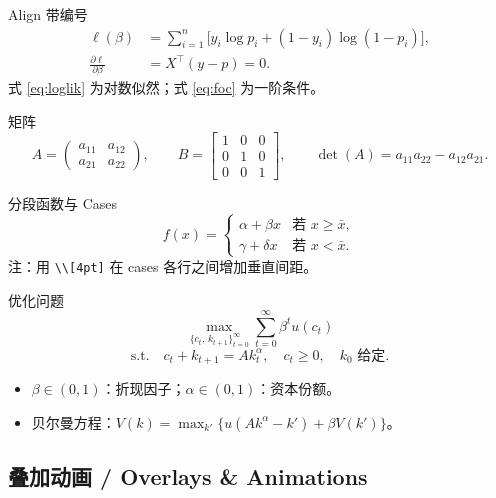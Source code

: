 \begin{frame}{Align 带编号}
  \begin{align}
    \ell(\beta) &= \sum_{i=1}^{n}
      \bigl[y_i \log p_i + (1-y_i)\log(1-p_i)\bigr], \label{eq:loglik} \\
    \frac{\partial \ell}{\partial \beta} &= X^\top(y - p) = 0. \label{eq:foc}
  \end{align}
  式 \eqref{eq:loglik} 为对数似然；式 \eqref{eq:foc} 为一阶条件。
\end{frame}

\begin{frame}{矩阵}
  \[
    A = \begin{pmatrix} a_{11} & a_{12} \\ a_{21} & a_{22} \end{pmatrix}, \qquad
    B = \begin{bmatrix} 1 & 0 & 0 \\ 0 & 1 & 0 \\ 0 & 0 & 1 \end{bmatrix}, \qquad
    \det(A) = a_{11}a_{22} - a_{12}a_{21}.
  \]
\end{frame}

\begin{frame}{分段函数与 Cases}
  \[
    f(x) = \begin{cases}
      \alpha + \beta x   & \text{若 } x \geq \bar{x}, \\[4pt]
      \gamma + \delta x  & \text{若 } x < \bar{x}.
    \end{cases}
  \]
  \medskip
  注：用 \texttt{\textbackslash\textbackslash[4pt]} 在 cases 各行之间增加垂直间距。
\end{frame}

\begin{frame}{优化问题}
  \[
    \max_{\{c_t,\,k_{t+1}\}_{t=0}^{\infty}}
    \sum_{t=0}^{\infty} \beta^t u(c_t)
  \]
  \[
    \text{s.t.} \quad c_t + k_{t+1} = A k_t^\alpha, \quad
    c_t \geq 0, \quad k_0 \text{ 给定}.
  \]
  \begin{itemize}
    \item $\beta \in (0,1)$：折现因子；\quad $\alpha \in (0,1)$：资本份额。
    \item 贝尔曼方程：$V(k) = \max_{k'} \bigl\{u(Ak^\alpha - k') + \beta V(k')\bigr\}$。
  \end{itemize}
\end{frame}

\subsection{叠加动画 / Overlays \& Animations}

